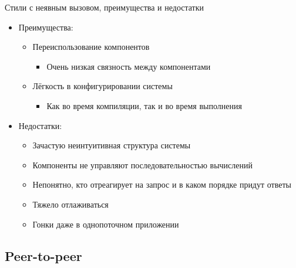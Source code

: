\documentclass{../../slides-style}
\begin{document}
    \begin{frame}{Стили с неявным вызовом, преимущества и недостатки}
        \begin{itemize}
            \item Преимущества:
            \begin{itemize}
                \item Переиспользование компонентов
                \begin{itemize}
                    \item Очень низкая связность между компонентами
                \end{itemize}
                \item Лёгкость в конфигурировании системы
                \begin{itemize}
                    \item Как во время компиляции, так и во время выполнения
                \end{itemize}
            \end{itemize}
            \item Недостатки:
            \begin{itemize}
                \item Зачастую неинтуитивная структура системы
                \item Компоненты не управляют последовательностью вычислений
                \item Непонятно, кто отреагирует на запрос и в каком порядке придут ответы
                \item Тяжело отлаживаться
                \item Гонки даже в однопоточном приложении
            \end{itemize}
        \end{itemize}
    \end{frame}

    \subsection{Peer-to-peer}
\end{document}
